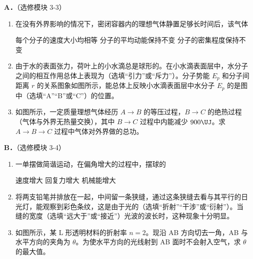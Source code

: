 \documentclass[\gkver]{gaokaozhenti}
\begin{document}
\begin{enumerate}
\textbf{A．}（选修模块 3-3）

\begin{enumerate}
	\item
	在没有外界影响的情况下，密闭容器内的理想气体静置足够长时间后，该气体
	
	{每个分子的速度大小均相等}
	{分子的平均动能保持不变}
	{分子的密集程度保持不变}
	\item
	由于水的表面张力，荷叶上的小水滴总是球形的。在小水滴表面层中，水分子之间的相互作用总体上表现为\tkanswer{}（选填“引力”或“斥力”）。分子势能 $E_{p}$ 和分子间距离 $r$ 的关系图象如图所示，能总体上反映小水滴表面层中水分子 $E_{p}$ 的是图中\tkanswer{}（选填“A”“B”或“C”）的位置。
	
	\item
	如图所示，一定质量理想气体经历 $A\rightarrow B$ 的等压过程，$B\rightarrow C$ 的绝热过程（气体与外界无热量交换），其中 $B\rightarrow C$ 过程中内能减少 $900\UJ$。求 $A\rightarrow B\rightarrow C$ 过程中气体对外界做的总功。
	
\end{enumerate}

\textbf{B．}（选修模块 3-4）

\begin{enumerate}
	\item
	一单摆做简谐运动，在偏角增大的过程中，摆球的
	
	{速度增大}
	{回复力增大}
	{机械能增大}
	\item
	将两支铅笔并排放在一起，中间留一条狭缝，通过这条狭缝去看与其平行的日光灯，能观察到彩色条纹，这是由于光的\tkanswer{}（选填“折射”“干涉”或“衍射”）。当缝的宽度\tkanswer{}（选填“远大于”或“接近”）光波的波长时，这种现象十分明显。
	\item
	如图所示，某 L 形透明材料的折射率 $n = 2$。现沿 AB 方向切去一角，AB 与水平方向的夹角为 $\theta$。为使水平方向的光线射到 AB 面时不会射入空气，求 $\theta$ 的最大值。
	
\end{enumerate}
\end{enumerate}
\end{document}
